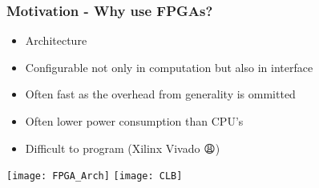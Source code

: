 \begin{frame}
  \frametitle{Motivation - Why use FPGAs?}
  \begin{minipage}[b]{0.45\textwidth}
  \begin{itemize}
    \item Architecture
    \item Configurable not only in computation but also in interface
    \item Often fast as the overhead from generality is ommitted
    \item Often lower power consumption than CPU's
    \item Difficult to program (Xilinx Vivado {\DejaSans 😩})
  \end{itemize}
  \end{minipage}
\vspace{30px}
\begin{minipage}[b]{0.50\textwidth}
\texttt{[image: FPGA\_Arch]}
\texttt{[image: CLB]}
\end{minipage}
\end{frame}
